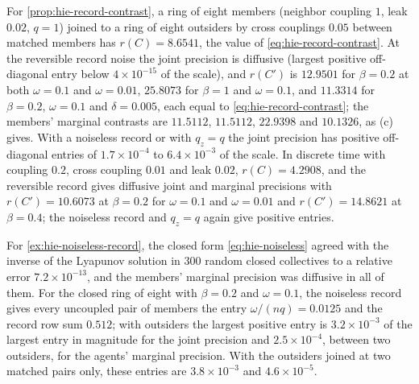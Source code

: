 \begin{numcheck}\label{chk:hie-record-precision}
For \cref{prop:hie-record-contrast}, a ring of eight members (neighbor coupling $1$, leak $0.02$, $q=1$) joined to a ring of eight outsiders by cross couplings $0.05$ between matched members has $r(C)=8.6541$, the value of \eqref{eq:hie-record-contrast}. At the reversible record noise the joint precision is diffusive (largest positive off-diagonal entry below $4\times10^{-15}$ of the scale), and $r(C')$ is $12.9501$ for $\beta=0.2$ at both $\omega=0.1$ and $\omega=0.01$, $25.8073$ for $\beta=1$ and $\omega=0.1$, and $11.3314$ for $\beta=0.2$, $\omega=0.1$ and $\delta=0.005$, each equal to \eqref{eq:hie-record-contrast}; the members' marginal contrasts are $11.5112$, $11.5112$, $22.9398$ and $10.1326$, as (c) gives. With a noiseless record or with $q_z=q$ the joint precision has positive off-diagonal entries of $1.7\times10^{-4}$ to $6.4\times10^{-3}$ of the scale. In discrete time with coupling $0.2$, cross coupling $0.01$ and leak $0.02$, $r(C)=4.2908$, and the reversible record gives diffusive joint and marginal precisions with $r(C')=10.6073$ at $\beta=0.2$ for $\omega=0.1$ and $\omega=0.01$ and $r(C')=14.8621$ at $\beta=0.4$; the noiseless record and $q_z=q$ again give positive entries.

For \cref{ex:hie-noiseless-record}, the closed form \eqref{eq:hie-noiseless} agreed with the inverse of the Lyapunov solution in $300$ random closed collectives to a relative error $7.2\times10^{-13}$, and the members' marginal precision was diffusive in all of them. For the closed ring of eight with $\beta=0.2$ and $\omega=0.1$, the noiseless record gives every uncoupled pair of members the entry $\omega/(nq)=0.0125$ and the record row sum $0.512$; with outsiders the largest positive entry is $3.2\times10^{-3}$ of the largest entry in magnitude for the joint precision and $2.5\times10^{-4}$, between two outsiders, for the agents' marginal precision. With the outsiders joined at two matched pairs only, these entries are $3.8\times10^{-3}$ and $4.6\times10^{-5}$.


\end{numcheck}
